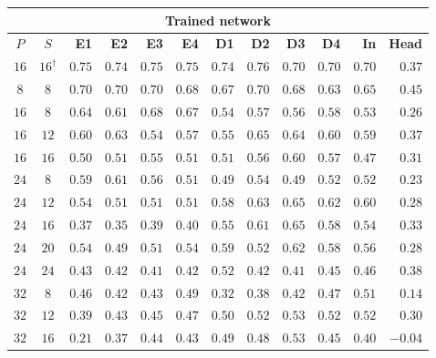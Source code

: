 \begin{table}[!tbp]
    \centering
    \small
    \setlength{\tabcolsep}{3.5pt}
    \begin{tabular}{@{}ccrrrrrrrrrr@{}}
        \toprule
        \multicolumn{12}{c}{\textbf{Trained network}} \\
        \midrule
        \textbf{$P$} & \textbf{$S$} & \textbf{E1} & \textbf{E2} & \textbf{E3} & \textbf{E4} & \textbf{D1} & \textbf{D2} & \textbf{D3} & \textbf{D4} & \textbf{In} & \textbf{Head} \\
        \midrule
        $16$ & $16^{\dagger}$ & $0.75$ & $0.74$ & $0.75$ & $0.75$ & $0.74$ & $0.76$ & $0.70$ & $0.70$ & $0.70$ & $0.37$ \\
        \midrule
        \addlinespace[2pt]
        $8$ & $8$ & $0.70$ & $0.70$ & $0.70$ & $0.68$ & $0.67$ & $0.70$ & $0.68$ & $0.63$ & $0.65$ & $0.45$ \\
        \addlinespace[2pt]
        $16$ & $8$ & $0.64$ & $0.61$ & $0.68$ & $0.67$ & $0.54$ & $0.57$ & $0.56$ & $0.58$ & $0.53$ & $0.26$ \\
        $16$ & $12$ & $0.60$ & $0.63$ & $0.54$ & $0.57$ & $0.55$ & $0.65$ & $0.64$ & $0.60$ & $0.59$ & $0.37$ \\
        $16$ & $16$ & $0.50$ & $0.51$ & $0.55$ & $0.51$ & $0.51$ & $0.56$ & $0.60$ & $0.57$ & $0.47$ & $0.31$ \\
        \addlinespace[2pt]
        $24$ & $8$ & $0.59$ & $0.61$ & $0.56$ & $0.51$ & $0.49$ & $0.54$ & $0.49$ & $0.52$ & $0.52$ & $0.23$ \\
        $24$ & $12$ & $0.54$ & $0.51$ & $0.51$ & $0.51$ & $0.58$ & $0.63$ & $0.65$ & $0.62$ & $0.60$ & $0.28$ \\
        $24$ & $16$ & $0.37$ & $0.35$ & $0.39$ & $0.40$ & $0.55$ & $0.61$ & $0.65$ & $0.58$ & $0.54$ & $0.33$ \\
        $24$ & $20$ & $0.54$ & $0.49$ & $0.51$ & $0.54$ & $0.59$ & $0.52$ & $0.62$ & $0.58$ & $0.56$ & $0.28$ \\
        $24$ & $24$ & $0.43$ & $0.42$ & $0.41$ & $0.42$ & $0.52$ & $0.42$ & $0.41$ & $0.45$ & $0.46$ & $0.38$ \\
        \addlinespace[2pt]
        $32$ & $8$ & $0.46$ & $0.42$ & $0.43$ & $0.49$ & $0.32$ & $0.38$ & $0.42$ & $0.47$ & $0.51$ & $0.14$ \\
        $32$ & $12$ & $0.39$ & $0.43$ & $0.45$ & $0.47$ & $0.50$ & $0.52$ & $0.53$ & $0.52$ & $0.52$ & $0.30$ \\
        $32$ & $16$ & $0.21$ & $0.37$ & $0.44$ & $0.43$ & $0.49$ & $0.48$ & $0.53$ & $0.45$ & $0.40$ & $-0.04$ \\

\end{tabular}
\end{table}

